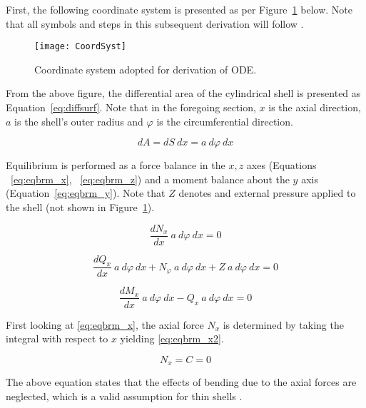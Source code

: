 First, the following coordinate system is presented as per Figure~\ref{fig:CoordSyst} below. Note that all symbols and steps in this subsequent derivation will follow \cite{timoshenko1959theory}.

\begin{figure}[H]
	\centering
	\texttt{[image: CoordSyst]}
	\caption[Coordinate system adopted for derivation of ODE.]{Coordinate system adopted for derivation of ODE.\protect\cite{timoshenko1959theory}}
	\label{fig:CoordSyst}
\end{figure}

From the above figure, the differential area of the cylindrical shell is presented as Equation~\ref{eq:diffsurf}. Note that in the foregoing section, $x$ is the axial direction, $a$ is the shell's outer radius and $\varphi$ is the circumferential direction.
 
\begin{equation}
	\label{eq:diffsurf}
	dA = dS\ dx = a\ d\varphi \ dx   
\end{equation}

Equilibrium is performed as a force balance in the $x, z$ axes (Equations ~\ref{eq:eqbrm_x}, ~\ref{eq:eqbrm_z}) and a moment balance about the $y$ axis (Equation~\ref{eq:eqbrm_y}). Note that $Z$ denotes and external pressure applied to the shell (not shown in Figure~\ref{fig:CoordSyst}).

\begin{equation}
	\label{eq:eqbrm_x}
	\frac{dN_x}{dx}\ a\ d\varphi \ dx = 0
\end{equation}

\begin{equation}
	\label{eq:eqbrm_z}
	\frac{dQ_x}{dx}\ a\ d\varphi \ dx+ N_\varphi \ a\ d\varphi \ dx +Z\ a\ d\varphi \ dx= 0
\end{equation}

\begin{equation}
	\label{eq:eqbrm_y}
	\frac{dM_x}{dx}\ a\ d\varphi \ dx- Q_x\ a\ d\varphi \ dx= 0
\end{equation}

First looking at \ref{eq:eqbrm_x}, the axial force $N_x$ is determined by taking the integral with respect to $x$ yielding \ref{eq:eqbrm_x2}. 

\begin{equation}
	\label{eq:eqbrm_x2}
	N_x = C = 0 
\end{equation}

The above equation states that the effects of bending due to the axial forces are neglected, which is a valid assumption for thin shells \cite{timoshenko1959theory}.\\

